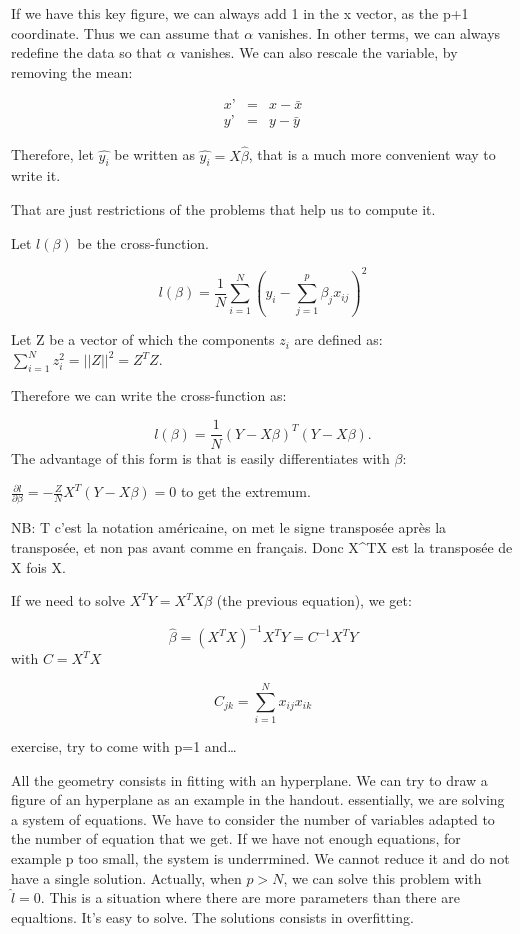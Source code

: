 \documentclass[a4paper]{tufte-book}
\begin{document}
{If we have this key figure, we can always add 1 in the x vector, as the p+1 coordinate. Thus we can assume that $\alpha$ vanishes. In other terms, we
can always redefine the data so that $\alpha$ vanishes. We can also rescale the variable, by removing the mean:

\begin{eqnarray}
x’&=& x-\bar{x}\\
y’&=& y-\bar{y}
\end{eqnarray}

Therefore, let $\hat{y_i}$ be written as $\hat{y_i} = X \hat{\beta}$, that is a much more convenient way to write it.

That are just restrictions of the problems that help us to compute it.

Let $l(\beta)$ be the cross-function.

\begin{equation}
l(\beta) = \frac{1}{N} \sum_{i=1}^N \left( y_i - \sum_{j=1}^p \beta_j x_{ij} \right)^2
\end{equation}

Let Z be a vector of which the components $z_i$ are defined as: $\sum_{i=1}^N z_i^2 = ||Z||^2 = Z^TZ.$

Therefore we can write the cross-function as:

\begin{equation}
l(\beta) = \frac{1}{N} (Y-X\beta)^T(Y-X\beta).
\end{equation}
The advantage of this form is that is easily differentiates with $\beta$:

$\frac{\partial l}{\partial \beta} =  -\frac{Z}{N} X^T(Y-X\beta) =0$ to get the extremum.

NB: T c’est la notation américaine, on met le signe transposée après la transposée, et non pas avant comme en français. Donc X^TX est la transposée de X fois X.

If we need to solve $X^TY = X^TX\beta$ (the previous equation), we get:

\begin{equation}
\hat{\beta} = (X^TX)^{-1} X^TY = C^{-1} X^TY
\end{equation}
with $C = X^TX$

\begin{equation}
C_{jk} = \sum_{i=1}^N x_{ij} x_{ik}
\end{equation}

exercise, try to come with p=1 and…

All the geometry consists in fitting with an hyperplane. We can try to draw a figure of an hyperplane as an example in the handout.
essentially, we are solving a system of equations. We have to consider the number of variables adapted to the number of equation that we get. If we have not enough equations, for example p too small, the system is underrmined. We cannot reduce it and do not have a single solution.
Actually, when $p>N$, we can solve this problem with $\hat{l}=0$. This is a situation where there are more parameters than there are equaltions. It’s easy to solve. The solutions consists in overfitting.

}
\end{document}
